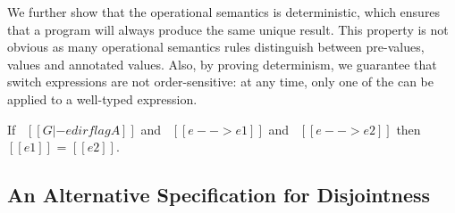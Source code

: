 We further show that the operational semantics is deterministic, which ensures
that a program will always produce the same unique result. This property is not
obvious as many operational semantics rules distinguish between pre-values,
values and annotated values. Also, by proving determinism, we guarantee that
switch expressions are not order-sensitive: at any time, only one of the
 can be applied to a well-typed expression.

\begin{theorem}[Determinism]
\label{lemma:union:determinism}
  If \ $[[G |- e dirflag A]]$ and \ $[[e --> e1]]$ and \ $[[e --> e2]]$ then $[[e1]]$ = $[[e2]]$.
\end{theorem}

\begin{comment}
\begin{proof}
  By induction on first reduction relation and inverting second reduction relation subsequently.
  All cases are trivial to solve by simple inversions except:
  \begin{itemize}
    \item Case \rref{typ-typeof} requires \cref{lemma:union:check-both-disj-false}.
  \end{itemize}
\end{proof}

\begin{lemma}[check-both-disj-false]
\label{lemma:union:check-both-disj-false}
If \ $[[A *s B]]$ \ and \ $[[G |- p <= A]]$ \ and \ $[[G |- p <= B]]$ \ then \ False.
\end{lemma}
\end{comment}



\subsection{An Alternative Specification for Disjointness}
\label{sec:union:discussion}
\begin{comment}
\snow{I feel the reason and consequence are flipped here. 
The alternative spec definitely equals to the previous one
because we define ``ordinary types" to satisfy:
1) no bottom-like types are ordinary;
2) any type must have an ordinary subtype if it is not bottom-like.
Or we need to provide some intuition for ordinary types themselves.}
\end{comment}

